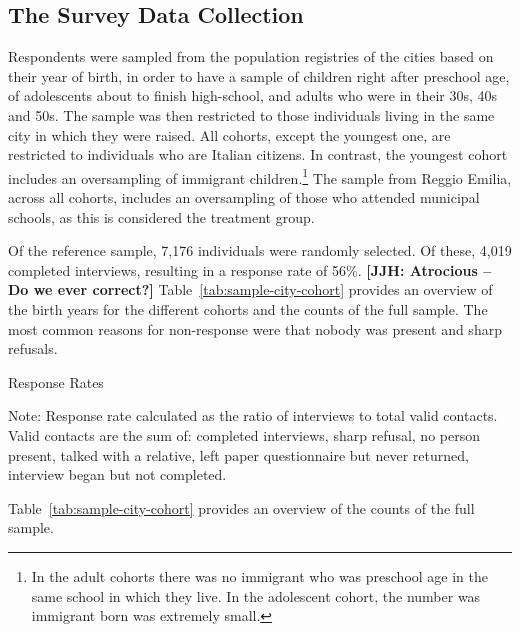 \subsection{The Survey Data Collection}

Respondents were sampled from the population registries of the cities based on their year of birth, in order to have a sample of children right after preschool age, of adolescents about to finish high-school, and adults who were in their 30s, 40s and 50s. The sample was then restricted to those individuals living in the same city in which they were raised. All cohorts, except the youngest one, are restricted to individuals who are Italian citizens. In contrast, the youngest cohort includes an oversampling of immigrant children.\footnote{In the adult cohorts there was no immigrant who was preschool age in the same school in which they live. In the adolescent cohort, the number was immigrant born was extremely small.} The sample from Reggio Emilia, across all cohorts, includes an oversampling of those who attended municipal schools, as this is considered the treatment group.

Of the reference sample, 7,176 individuals were randomly selected. Of these, 4,019 completed interviews, resulting in a response rate of 56\%. \textbf{[JJH: Atrocious -- Do we ever correct?]} Table~\ref{tab:sample-city-cohort} provides an overview of the birth years for the different cohorts and the counts of the full sample. The most common reasons for non-response were that nobody was present and sharp refusals. 

\begin{table}[H]
\centering
\begin{threeparttable}
	\caption{Response Rates}\label{tab:response-rate-city-cohort}
	
\begin{tablenotes}
\footnotesize
Note: Response rate calculated as the ratio of interviews to total valid contacts. Valid contacts are the sum of: completed interviews, sharp refusal, no person present, talked with a relative, left paper questionnaire but never returned, interview began but not completed.
\end{tablenotes}
\end{threeparttable}
\end{table}

Table~\ref{tab:sample-city-cohort} provides an overview of the counts of the full sample. 

